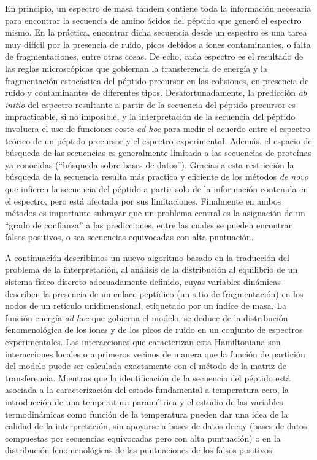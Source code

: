 En principio, un espectro de masa tándem contiene toda la información necesaria
para encontrar la secuencia de amino ácidos del péptido que generó el espectro mismo.
En la práctica, encontrar dicha secuencia desde un espectro es una tarea muy
difícil por la presencia de ruido, picos debidos a iones
contaminantes, o falta de fragmentaciones, entre otras cosas.
De echo, cada espectro es el resultado de las reglas microscópicas que gobiernan
la transferencia de energía y la fragmentación estocástica del péptido precursor
en las colisiones, en presencia de ruido y contaminantes de diferentes tipos.
Desafortunadamente, la predicción \emph{ab initio} del espectro resultante a
partir de la secuencia del péptido precursor es impracticable, si no imposible,
y la interpretación de la secuencia del péptido involucra el uso de funciones
coste \emph{ad hoc} para medir el acuerdo entre el espectro teórico de un
péptido precursor y el espectro experimental.
Además, el espacio de búsqueda de las secuencias es generalmente limitada a las
secuencias de proteínas ya conocidas (``búsqueda sobre bases de datos''). 
Gracias a esta restricción la búsqueda de la secuencia resulta
más practica y eficiente de los métodos \emph{de novo}
que infieren la secuencia del péptido a partir solo de la información contenida
en el espectro, pero está afectada por sus limitaciones.
Finalmente en ambos métodos es importante subrayar que un problema central es la
asignación de un ``grado de confianza'' a las predicciones, entre las cuales
se pueden encontrar falsos positivos, o sea secuencias equivocadas con alta
puntuación.


A continuación describimos un nuevo algoritmo basado en la traducción del problema de la
interpretación, al análisis de la distribución al equilibrio de un sistema
físico discreto adecuadamente definido, cuyas variables dinámicas describen la
presencia de un enlace peptídico (un sitio de fragmentación) en los nodos de un
retículo unidimensional, etiquetado por un índice de masa.
La función energía \emph{ad hoc} que gobierna el modelo, se deduce de la
distribución fenomenológica de los iones y de los picos de ruido en un conjunto de espectros
experimentales.
Las interacciones que caracterizan esta Hamiltoniana son interacciones locales o
a primeros vecinos de manera que la función de partición del modelo puede ser
calculada exactamente con el método de la matriz de transferencia.
Mientras que la identificación de la secuencia del péptido está asociada a la
caracterización del estado fundamental a temperatura cero, la introducción de
una temperatura paramétrica y el estudio de las variables termodinámicas como
función de la temperatura pueden dar una idea de la calidad de la
interpretación, sin apoyarse a bases de datos decoy (bases de datos compuestas por
secuencias equivocadas pero con alta puntuación) o en la distribución
fenomenológicas de las puntuaciones de los falsos positivos.

